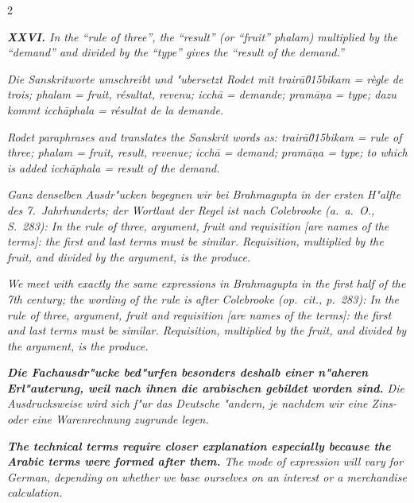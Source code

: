 \documentclass[10pt,a4paper]{article}
\newcommand{\enquote}[1]{``#1''}
\begin{document}
\begin{paracol}{2}
\switchcolumn

\textit{\textbf{XXVI.} \textit{In the \enquote{rule of three}, the \enquote{result} (or \enquote{fruit} \textit{phalam}) multiplied by the \enquote{demand} and divided by the \enquote{type} gives the \enquote{result of the demand.}}}

\switchcolumn*

\textit{Die Sanskritworte umschreibt und "ubersetzt Rodet mit \textit{trair\=a\u015bikam} = r\`egle de trois; \textit{phalam} = fruit, r\'esultat, revenu; \textit{icch\=a} = demande; \textit{pram\=a\d{n}a} = type; dazu kommt \textit{icch\=aphala} = r\'esultat de la demande.}

\switchcolumn

\textit{Rodet paraphrases and translates the Sanskrit words as: \textit{trair\=a\u015bikam} = rule of three; \textit{phalam} = fruit, result, revenue; \textit{icch\=a} = demand; \textit{pram\=a\d{n}a} = type; to which is added \textit{icch\=aphala} = result of the demand.}

\switchcolumn*

\textit{Ganz denselben Ausdr"ucken begegnen wir bei Brahmagupta in der ersten H"alfte des 7.\ Jahrhunderts; der Wortlaut der Regel ist nach Colebrooke (a.\ a.\ O., S.\ 283): \textit{In the rule of three, argument, fruit and requisition [are names of the terms]: the first and last terms must be similar. Requisition, multiplied by the fruit, and divided by the argument, is the produce.}}

\switchcolumn

\textit{We meet with exactly the same expressions in Brahmagupta in the first half of the 7th century; the wording of the rule is after Colebrooke (\textit{op.\ cit.}, p.\ 283): \textit{In the rule of three, argument, fruit and requisition [are names of the terms]: the first and last terms must be similar. Requisition, multiplied by the fruit, and divided by the argument, is the produce.}}

\switchcolumn*

\textit{\textbf{Die Fachausdr"ucke bed"urfen besonders deshalb einer n"aheren Erl"auterung, weil nach ihnen die arabischen gebildet worden sind.} Die Ausdrucksweise wird sich f"ur das Deutsche "andern, je nachdem wir eine Zins- oder eine Warenrechnung zugrunde legen.}

\switchcolumn

\textit{\textbf{The technical terms require closer explanation especially because the Arabic terms were formed after them.} The mode of expression will vary for German, depending on whether we base ourselves on an interest or a merchandise calculation.}


\end{paracol}
\end{document}
